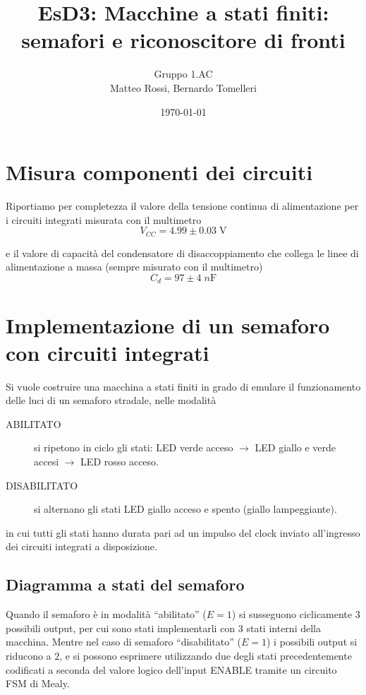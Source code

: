 \documentclass[10pt, a4paper, italian]{article}
\author{Gruppo 1.AC \\ Matteo Rossi, Bernardo Tomelleri}
\title{EsD3: Macchine a stati finiti: semafori e riconoscitore di fronti}
\begin{document}
\date{\today}
\maketitle

\section{Misura componenti dei circuiti}
Riportiamo per completezza il valore della tensione continua di
alimentazione per i circuiti integrati misurata con il multimetro
\[
V_{CC} = 4.99 \pm 0.03 \; \si{\V}
\]

e il valore di capacità del condensatore di disaccoppiamento che collega le
linee di alimentazione a massa (sempre misurato con il multimetro)
\[
C_d = 97 \pm 4 \; \si{n\F}
\]

\section{Implementazione di un semaforo con circuiti integrati}\label{sec: IC}
Si vuole costruire una macchina a stati finiti in grado di emulare il
funzionamento delle luci di un semaforo stradale, nelle modalità
\begin{description}
\item[ABILITATO] si ripetono in ciclo gli stati: LED verde acceso $\to$
LED giallo e verde accesi $\to$ LED rosso acceso.
\item[DISABILITATO] si alternano gli stati LED giallo acceso e spento
(giallo lampeggiante).
\end{description}
in cui tutti gli stati hanno durata pari ad un impulso del clock inviato
all'ingresso dei circuiti integrati a disposizione.

\subsection{Diagramma a stati del semaforo}
Quando il semaforo è in modalità ``abilitato'' ($E=1$) si susseguono
ciclicamente 3 possibili output, per cui sono stati implementarli con $3$ stati
interni della macchina. Mentre nel caso di semaforo ``disabilitato'' ($E=1$) i
possibili output si riducono a $2$, e si possono esprimere utilizzando due
degli stati precedentemente codificati a seconda del valore logico dell'input
ENABLE tramite un circuito FSM di Mealy.
\end{document}
